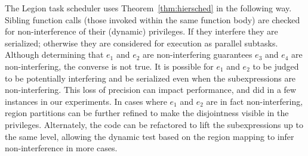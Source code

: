  The Legion task scheduler uses Theorem~\ref{thm:hiersched} in the
following way.  Sibling function calls (those invoked within the same
function body) are checked for non-interference of their (dynamic)
privileges.  If they interfere they are serialized; otherwise they are
considered for execution as parallel subtasks.  Although determining that $e_1$
and $e_2$ are non-interfering guarantees $e_3$ and $e_4$ are
non-interfering, the converse is not true.  It is possible for $e_1$
and $e_2$ to be judged to be potentially interfering and be serialized
even when the subexpressions are non-interfering.  This loss of
precision can impact performance, and did in a few instances in our
experiments.  
In cases where $e_1$ and $e_2$ are in fact
non-interfering, region partitions can be further refined to make the
disjointness visible in the privileges.  Alternately, the code can be
refactored to lift the subexpressions up to the same level, allowing
the dynamic test based on the region mapping to infer non-interference
in more cases.  

